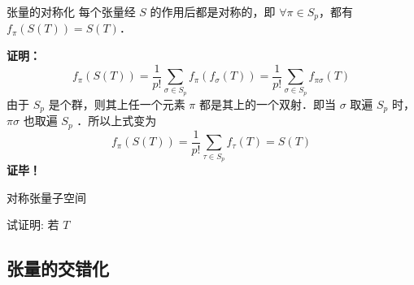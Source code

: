 \begin{theorem}{张量的对称化}
每个张量经 $S$ 的作用后都是对称的，即 $\forall \pi\in S_p$，都有 $f_\pi(S(T))=S(T)$．
\end{theorem}
\textbf{证明：}
\begin{equation}
f_\pi(S(T))=\frac{1}{p!}\sum_{\sigma\in S_p} f_\pi(f_\sigma(T))=\frac{1}{p!}\sum_{\sigma\in S_p} f_{\pi\sigma}(T)
\end{equation}
由于 $S_p$ 是个群，则其上任一个元素 $\pi$ 都是其上的一个双射．即当 $\sigma$ 取遍 $S_p$ 时，$\pi\sigma$ 也取遍 $S_p$ ．所以上式变为
\begin{equation}
f_\pi(S(T))=\frac{1}{p!}\sum_{\tau\in S_p} f_{\tau}(T)=S(T)
\end{equation}
\textbf{证毕！}
\begin{definition}{对称张量子空间}

\end{definition}
\begin{exercise}{}
试证明: 若 $T$
\end{exercise}
\subsection{张量的交错化}